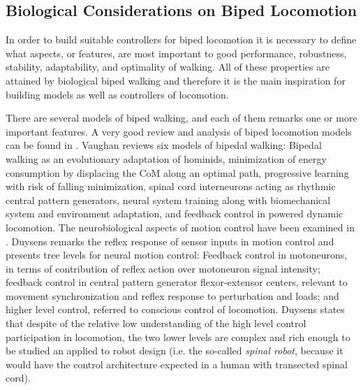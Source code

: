 \subsection{Biological Considerations on Biped Locomotion}


In order to build suitable controllers for biped locomotion it is necessary to define what aspects, or features, are most important to good performance, robustness, stability, adaptability, and optimality of walking. All of these properties are attained by biological biped walking and therefore it is the main inspiration for building models as well as controllers of locomotion.


There are several models of biped walking, and each of them remarks
one or more important features. A very good review and analysis of
biped locomotion models can be found in
\cite{Vaughan03Theories}. Vaughan reviews six models of bipedal
walking: Bipedal walking as an evolutionary adaptation of hominids,
minimization of energy consumption by displacing the CoM along an
optimal path, progressive learning with risk of falling minimization,
spinal cord interneurons acting as rhythmic central pattern
generators, neural system training along with biomechanical system and
environment adaptation, and feedback control in powered dynamic
locomotion. The neurobiological aspects of motion control have been
examined in \cite{Duysens02walking}. Duysens remarks the reflex
response of sensor inputs in motion control and presents tree levels
for neural motion control: Feedback control in motoneurons, in terms
of contribution of reflex action over motoneuron signal intensity;
feedback control in central pattern generator flexor-extensor centers,
relevant to movement synchronization and reflex response to
perturbation and loads; and higher level control, referred to
conscious control of locomotion. Duysens states that despite of the
relative low understanding of the high level control participation in
locomotion, the two lower levels are complex and rich enough to be
studied an applied to robot design (i.e. the so-called {\it spinal
  robot}, because it would have the control architecture expected in a
human with transected spinal cord).








